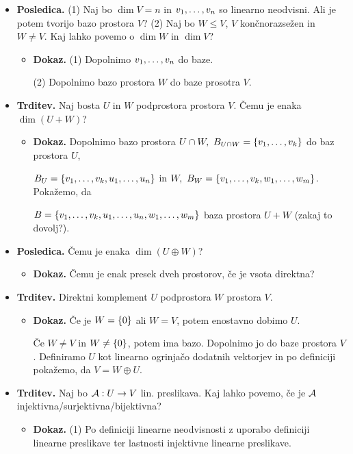 \begin{enumerate}
\begin{itemize}
        \newpage
        \item \colorbox{orange!30}{\textbf{Posledica.}} (1) Naj bo $\dim V = n$ in ${v}_1, \ldots, {v}_{n}$ so linearno neodvisni. Ali je potem tvorijo bazo prostora $V$? (2) Naj bo $W \leq V$, $V$ končnorazsežen in $W \neq V$. Kaj lahko povemo o $\dim W$ in $\dim V$?        
        \begin{itemize}
            \item \colorbox{green!30}{\textbf{Dokaz.}} (1) Dopolnimo ${v}_1, \ldots, {v}_{n}$ do baze.
            
            (2) Dopolnimo bazo prostora $W$ do baze prosotra $V$.
        \end{itemize}
        \item \colorbox{blue!30}{\textbf{Trditev.}} Naj bosta $U$ in $W$ podprostora prostora $V$. Čemu je enaka $\dim (U+W)$?
        \begin{itemize}
            \item \colorbox{green!30}{\textbf{Dokaz.}} Dopolnimo bazo prostora $U \cap W, \ B_{U \cap W} = \left\{v_1, \ldots, v_k\right\}$ do baz prostora $U$,
            
            $B_U = \left\{v_1, \ldots, v_k, u_1, \ldots, u_n\right\}$ in $W, \ B_W = \left\{v_1, \ldots, v_k, w_1, \ldots, w_m\right\}$. Pokažemo, da 
            
            $B = \left\{v_1, \ldots, v_k, u_1, \ldots, u_n, w_1, \ldots, w_m\right\}$ baza prostora $U+W$ (zakaj to dovolj?).
        \end{itemize}
        \item \colorbox{orange!30}{\textbf{Posledica.}} Čemu je enaka $\dim (U \oplus  W)$?
        \begin{itemize}
            \item \colorbox{green!30}{\textbf{Dokaz.}} Čemu je enak presek dveh prostorov, če je vsota direktna?
        \end{itemize}
        \item \colorbox{blue!30}{\textbf{Trditev.}} Direktni komplement $U$ podprostora $W$ prostora $V$.
        \begin{itemize}
            \item \colorbox{green!30}{\textbf{Dokaz.}} Če je $W = \left\{0\right\}$ ali $W = V$, potem enostavno dobimo $U$.
            
            Če $W \neq V$ in $W \neq \left\{0\right\}$, potem ima bazo. Dopolnimo jo do baze prostora $V$. Definiramo $U$ kot linearno ogrinjačo dodatnih vektorjev in po definiciji pokažemo, da $V = W \oplus U$.
        \end{itemize}
        \item \colorbox{blue!30}{\textbf{Trditev.}} Naj bo $\mathcal{A}: U \to V$ lin. preslikava. Kaj lahko povemo, če je $\mathcal{A}$ injektivna/surjektivna/bijektivna?
        \begin{itemize}
            \item \colorbox{green!30}{\textbf{Dokaz.}} (1) Po definiciji linearne neodvisnosti z uporabo definiciji linearne preslikave ter lastnosti injektivne linearne preslikave.
            

\end{itemize}
\end{itemize}
\end{enumerate}
